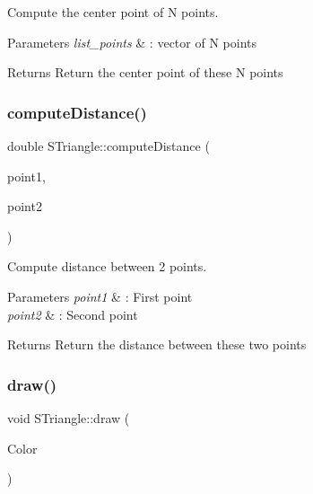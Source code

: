 Compute the center point of N points. 


\begin{DoxyParams}{Parameters}
{\em list\+\_\+points} & \+: vector of N points \\
\hline
\end{DoxyParams}
\begin{DoxyReturn}{Returns}
Return the center point of these N points 
\end{DoxyReturn}
\mbox{\label{classSTriangle_af96113a4a0ecfbb8fabd8d23b6e3384a}} 
\subsubsection{\texorpdfstring{compute\+Distance()}{computeDistance()}}
{\footnotesize\ttfamily double S\+Triangle\+::compute\+Distance (\begin{DoxyParamCaption}\item[{const \hyperlink{classPoint}{Point}$<$ double $>$ \&}]{point1,  }\item[{const \hyperlink{classPoint}{Point}$<$ double $>$ \&}]{point2 }\end{DoxyParamCaption})}



Compute distance between 2 points. 


\begin{DoxyParams}{Parameters}
{\em point1} & \+: First point \\
\hline
{\em point2} & \+: Second point \\
\hline
\end{DoxyParams}
\begin{DoxyReturn}{Returns}
Return the distance between these two points 
\end{DoxyReturn}
\mbox{\label{classSTriangle_a7eddfc5b9e5b2951ba71b085345d87d1}} 
\subsubsection{\texorpdfstring{draw()}{draw()}}
{\footnotesize\ttfamily void S\+Triangle\+::draw (\begin{DoxyParamCaption}\item[{M\+L\+V\+\_\+\+Color}]{Color }\end{DoxyParamCaption})}



